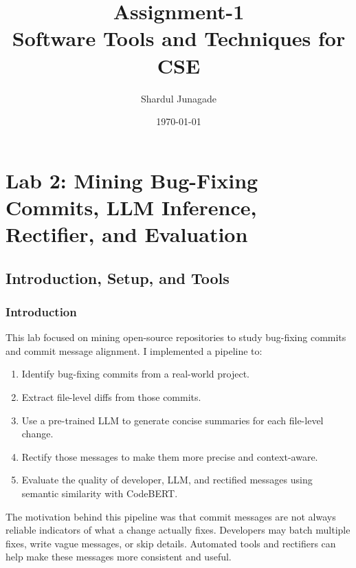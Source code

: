 \documentclass[10pt,a4paper]{report}
\title{\Huge Assignment-1 \\[0.5cm] \LARGE Software Tools and Techniques for CSE}
\author{\Large Shardul Junagade}
\date{\large \today}
\begin{document}
\maketitle
\newpage

\tableofcontents
\newpage



\chapter{Lab 2: Mining Bug-Fixing Commits, LLM Inference, Rectifier, and Evaluation}

\section{Introduction, Setup, and Tools}

\subsection{Introduction}
This lab focused on mining open-source repositories to study bug-fixing commits and commit message alignment. I implemented a pipeline to:
\begin{enumerate}[itemsep=0.05em, topsep=0pt]
    \item Identify bug-fixing commits from a real-world project.
    \item Extract file-level diffs from those commits.
    \item Use a pre-trained LLM to generate concise summaries for each file-level change.
    \item Rectify those messages to make them more precise and context-aware.
    \item Evaluate the quality of developer, LLM, and rectified messages using semantic similarity with CodeBERT.
\end{enumerate}

The motivation behind this pipeline was that commit messages are not always reliable indicators of what a change actually fixes. Developers may batch multiple fixes, write vague messages, or skip details. Automated tools and rectifiers can help make these messages more consistent and useful.
\end{document}
